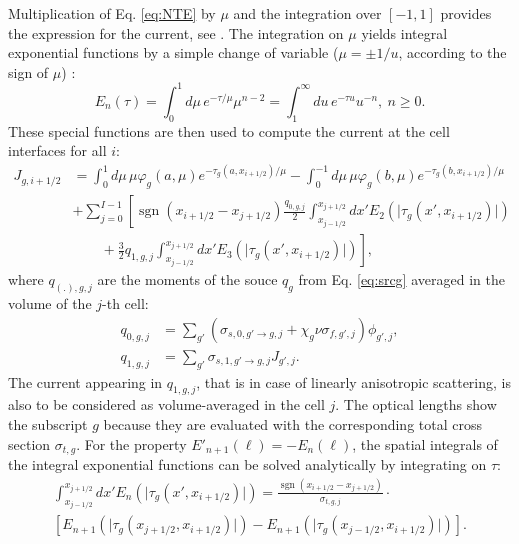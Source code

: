 \documentclass{ictt26}
\DeclareMathOperator{\sign}{sgn}
\begin{document}
Multiplication of Eq. \ref{eq:NTE} by $\mu$ and the integration over $[-1, 1]$ provides the expression for the current, see \cite{tomatis2011application}. The integration on $\mu$ yields integral exponential functions by a simple change of variable ($\mu = \pm 1/u$, according to the sign of $\mu$) \cite{AS1964handbook}:
\begin{equation*}
E_n(\tau) = \int_0^1{d\mu\, e^{-\tau / \mu} \mu^{n-2}} = \int_1^\infty{du\, e^{-\tau u}u^{-n}}, \: n \geq 0.
\end{equation*}
These special functions are then used to compute the current at the cell interfaces for all $i$:
\begin{equation}
\begin{split}
J_{g,i+1/2} &= \int_0^{ 1}{d\mu\, \mu \varphi_g(a, \mu) e^{-\tau_g(a, x_{i+1/2})/\mu}}
             - \int_0^{-1}{d\mu\, \mu \varphi_g(b, \mu) e^{-\tau_g(b, x_{i+1/2})/\mu}}\\
  & + \sum_{j=0}^{I-1} \left[  \sign(x_{i+1/2} - x_{j+1/2}) \frac{q_{0,g,j}}{2} \int_{x_{j-1/2}}^{x_{j+1/2}}{dx' E_{2}\left(\lvert \tau_g(x', x_{i+1/2}) \rvert \right) } \right.\\
  & \left. \qquad+ \frac{3}{2}q_{1,g,j} \int_{x_{j-1/2}}^{x_{j+1/2}}{dx' E_{3}\left(\lvert \tau_g(x', x_{i+1/2}) \rvert \right) }\right],
\end{split}
\label{eq:J_tr}
\end{equation}
where $q_{(.),g,j}$ are the moments of the souce $q_g$ from Eq. \ref{eq:srcg} averaged in the volume of the $j$-th cell:
\begin{subequations}
\label{eq:srclg}
\begin{align}
   q_{0,g,j} &= \sum_{g'}\left(\sigma_{s,0,g' \rightarrow g,j} +
                              \chi_g \nu\sigma_{f,g',j}
                        \right) \phi_{g',j},\label{eq:srclg0}\\
   q_{1,g,j} &= \sum_{g'}\sigma_{s,1,g' \rightarrow g,j}J_{g',j}.\label{eq:srclg1}
\end{align}
\end{subequations}
The current appearing in $q_{1,g,j}$, that is in case of linearly anisotropic scattering, is also to be considered as volume-averaged in the cell $j$. The optical lengths show the subscript $g$ because they are evaluated with the corresponding total cross section $\sigma_{t,g}$. For the property $E'_{n+1}(\ell) = -E_n(\ell)$, the spatial integrals of the integral exponential functions can be solved analytically by integrating on $\tau$:
\begin{equation*}
\begin{aligned}
\int_{x_{j-1/2}}^{x_{j+1/2}}{ dx' E_{n}\left(\lvert \tau_g(x', x_{i+1/2}) \rvert \right) } =
\frac{\sign(x_{i+1/2} - x_{j+1/2})}{\sigma_{t,g,j}} \cdot \\
\left[
  E_{n+1} \left(\lvert \tau_g(x_{j+1/2}, x_{i+1/2}) \rvert \right)
 -E_{n+1} \left(\lvert \tau_g(x_{j-1/2}, x_{i+1/2}) \rvert \right)
\right].
\end{aligned}
\end{equation*}
\end{document}

